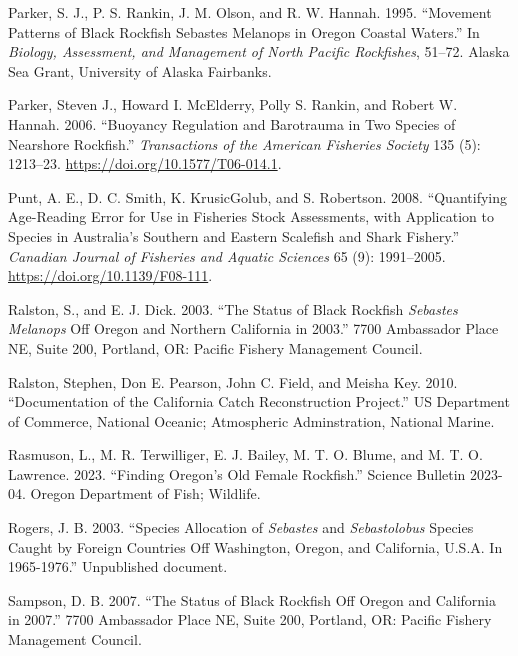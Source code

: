 \documentclass[11pt,
  english,
  letterpaper,
]{article}
\newlength{\cslhangindent}
\newenvironment{CSLReferences}[2] %
 {%
  \setlength{\parindent}{0pt}
  \ifodd #1 \everypar{\setlength{\hangindent}{\cslhangindent}}\ignorespaces\fi
  \ifnum #2 > 0
  \setlength{\parskip}{#2\baselineskip}
  \fi
 }%
 {}
\begin{document}
\begin{CSLReferences}{1}{0}
\leavevmode{}%
Parker, S. J., P. S. Rankin, J. M. Olson, and R. W. Hannah. 1995. {``Movement Patterns of Black Rockfish Sebastes Melanops in Oregon Coastal Waters.''} In \emph{Biology, Assessment, and Management of North Pacific Rockfishes}, 51--72. Alaska Sea Grant, University of Alaska Fairbanks.

\leavevmode{}%
Parker, Steven J., Howard I. McElderry, Polly S. Rankin, and Robert W. Hannah. 2006. {``Buoyancy Regulation and Barotrauma in Two Species of Nearshore Rockfish.''} \emph{Transactions of the American Fisheries Society} 135 (5): 1213--23. \url{https://doi.org/10.1577/T06-014.1}.

\leavevmode{}%
Punt, A. E., D. C. Smith, K. KrusicGolub, and S. Robertson. 2008. {``Quantifying Age-Reading Error for Use in Fisheries Stock Assessments, with Application to Species in {A}ustralia's Southern and Eastern Scalefish and Shark Fishery.''} \emph{Canadian Journal of Fisheries and Aquatic Sciences} 65 (9): 1991--2005. \url{https://doi.org/10.1139/F08-111}.

\leavevmode{}%
Ralston, S., and E. J. Dick. 2003. {``The Status of Black Rockfish \emph{{Sebastes} Melanops} Off Oregon and Northern California in 2003.''} 7700 Ambassador Place NE, Suite 200, Portland, OR: Pacific Fishery Management Council.

\leavevmode{}%
Ralston, Stephen, Don E. Pearson, John C. Field, and Meisha Key. 2010. {``Documentation of the {California} Catch Reconstruction Project.''} US Department of Commerce, National Oceanic; Atmospheric Adminstration, National Marine.

\leavevmode{}%
Rasmuson, L., M. R. Terwilliger, E. J. Bailey, M. T. O. Blume, and M. T. O. Lawrence. 2023. {``Finding Oregon's Old Female Rockfish.''} Science Bulletin 2023-04. Oregon Department of Fish; Wildlife.

\leavevmode{}%
Rogers, J. B. 2003. {``Species Allocation of \emph{{Sebastes}} and \emph{Sebastolobus} Species Caught by Foreign Countries Off {Washington}, {Oregon}, and {California}, {U}.{S}.{A}. In 1965-1976.''} Unpublished document.

\leavevmode{}%
Sampson, D. B. 2007. {``The Status of Black Rockfish Off Oregon and California in 2007.''} 7700 Ambassador Place NE, Suite 200, Portland, OR: Pacific Fishery Management Council.


\end{CSLReferences}
\end{document}
